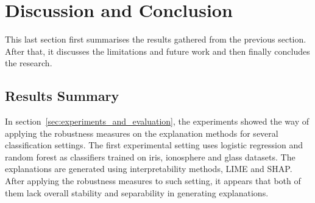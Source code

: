 \documentclass[english]{tktltiki2}
\theoremstyle{definition}
\theoremstyle{remark}
\begin{document}




\section{Discussion and Conclusion}\label{sec:conclusion} %
This last section first summarises the results gathered from the previous section. After that, it discusses the limitations and future work and then finally concludes the research. 

\subsection{Results Summary}\label{sec:results_summary} %
In section~\ref{sec:experiments_and_evaluation}, the experiments  showed the way of applying the robustness measures on the explanation methods for several classification settings. The first experimental setting uses logistic regression and random forest as classifiers trained on iris, ionosphere and glass datasets. The explanations are generated using interpretability methods, LIME and SHAP. After applying the robustness measures to such setting, it appears that both of them lack overall stability and separability in generating explanations.
\end{document}
